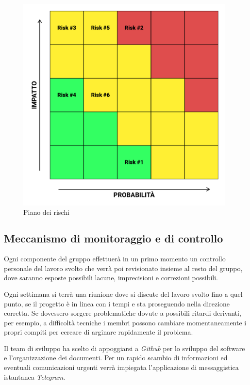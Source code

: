 \documentclass{article}
\begin{document}
  
  \begin{figure}[htbp]
  \centering
  \includegraphics[width=11cm]{gfx/Quadrati_rischi.pdf}
  \caption{Piano dei rischi}
  \end{figure}
  
  \subsection{Meccanismo di monitoraggio e di
  controllo}
  
  Ogni componente del gruppo effettuerà in un primo momento un controllo
  personale del lavoro svolto che verrà poi revisionato insieme al resto
  del gruppo, dove saranno esposte possibili lacune, imprecisioni e
  correzioni possibili.
  
  Ogni settimana si terrà una riunione dove si discute del lavoro svolto
  fino a quel punto, se il progetto è in linea con i tempi e sta
  proseguendo nella direzione corretta. Se dovessero sorgere problematiche dovute a possibili ritardi derivanti, per esempio, a difficoltà tecniche i membri possono cambiare momentaneamente i propri compiti per cercare di arginare rapidamente il problema.
  
  Il team di sviluppo ha scelto di appoggiarsi a \emph{Github} per lo sviluppo del software e l'organizzazione dei documenti. Per un rapido scambio di informazioni ed eventuali comunicazioni urgenti verrà impiegata l'applicazione di messaggistica istantanea \emph{Telegram}.
  
\end{document}
